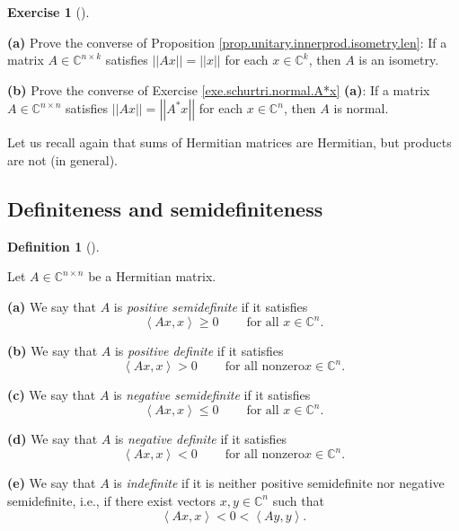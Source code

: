 \documentclass[numbers=enddot,12pt,final,onecolumn,notitlepage]{scrartcl}%
\newcounter{exer}
\numberwithin{exer}{subsection}
\theoremstyle{definition}
\newtheorem{defi}[theo]{Definition}
\newenvironment{definition}[1][]
{\begin{defi}[#1]\begin{leftbar}}
{\end{leftbar}\end{defi}}
\newtheorem{exmp}[exer]{Exercise}
\newenvironment{exercise}[1][]
{\begin{exmp}[#1]\begin{leftbar}}
{\end{leftbar}\end{exmp}}
\begin{document}
\begin{exercise}
 \textbf{(a)} Prove the converse of Proposition
\ref{prop.unitary.innerprod.isometry.len}: If a matrix $A\in\mathbb{C}%
^{n\times k}$ satisfies $\left\vert \left\vert Ax\right\vert \right\vert
=\left\vert \left\vert x\right\vert \right\vert $ for each $x\in\mathbb{C}%
^{k}$, then $A$ is an isometry. \medskip

\textbf{(b)} Prove the converse of Exercise \ref{exe.schurtri.normal.A*x}
\textbf{(a)}: If a matrix $A\in\mathbb{C}^{n\times n}$ satisfies $\left\vert
\left\vert Ax\right\vert \right\vert =\left\vert \left\vert A^{\ast
}x\right\vert \right\vert $ for each $x\in\mathbb{C}^{n}$, then $A$ is normal.
\end{exercise}

Let us recall again that sums of Hermitian matrices are Hermitian, but
products are not (in general).

\subsection{Definiteness and semidefiniteness}

\begin{definition}
Let $A\in\mathbb{C}^{n\times n}$ be a Hermitian matrix.

\textbf{(a)} We say that $A$ is \emph{positive semidefinite} if it satisfies%
\[
\left\langle Ax,x\right\rangle \geq0\ \ \ \ \ \ \ \ \ \ \text{for all }%
x\in\mathbb{C}^{n}.
\]


\textbf{(b)} We say that $A$ is \emph{positive definite} if it satisfies%
\[
\left\langle Ax,x\right\rangle >0\ \ \ \ \ \ \ \ \ \ \text{for all nonzero
}x\in\mathbb{C}^{n}.
\]


\textbf{(c)} We say that $A$ is \emph{negative semidefinite} if it satisfies%
\[
\left\langle Ax,x\right\rangle \leq0\ \ \ \ \ \ \ \ \ \ \text{for all }%
x\in\mathbb{C}^{n}.
\]


\textbf{(d)} We say that $A$ is \emph{negative definite} if it satisfies%
\[
\left\langle Ax,x\right\rangle <0\ \ \ \ \ \ \ \ \ \ \text{for all nonzero
}x\in\mathbb{C}^{n}.
\]


\textbf{(e)} We say that $A$ is \emph{indefinite} if it is neither positive
semidefinite nor negative semidefinite, i.e., if there exist vectors
$x,y\in\mathbb{C}^{n}$ such that%
\[
\left\langle Ax,x\right\rangle <0<\left\langle Ay,y\right\rangle .
\]

\end{definition}
\end{document}
